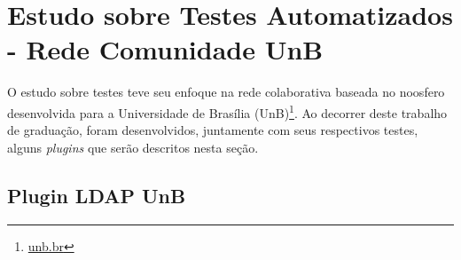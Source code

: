 
\section {Estudo sobre Testes Automatizados - Rede Comunidade UnB}

O estudo sobre testes teve seu enfoque na rede colaborativa baseada 
no noosfero desenvolvida para a Universidade de Brasília (UnB)\footnote{\url{unb.br}}. Ao decorrer deste trabalho de graduação, foram desenvolvidos, juntamente com seus respectivos testes, alguns \textit{plugins} que serão descritos nesta seção.

\subsection{Plugin LDAP UnB}

